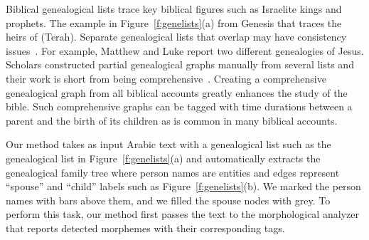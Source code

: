 \documentclass{llncs}
\newcommand{\utfRL}[1]{\setcode{utf8} \RL{#1} \setcode{standard}}
\begin{document}



%
Biblical genealogical lists 
trace key biblical figures such as 
Israelite kings and prophets.
The example in 
Figure~\ref{f:genelists}(a)
from Genesis that traces the
heirs of \utfRL{تارح} (Terah).
Separate genealogical lists that overlap may have consistency 
issues~\cite{completeBibleGenealogy:Online}. 
For example, Matthew and Luke report two different 
genealogies of Jesus. 
Scholars constructed partial genealogical graphs 
manually from several lists
and their work is short from being 
comprehensive~\cite{Belote:Online,SoulLiberty:Online}.
Creating a comprehensive genealogical graph from all biblical 
accounts greatly enhances the study of the bible. 
Such comprehensive graphs can be tagged
with time durations between a parent and the birth of 
its children as is common in many biblical accounts. 

Our method takes as input Arabic text with a genealogical
list such as the genealogical list in
Figure~\ref{f:genelists}(a) 
and automatically extracts the genealogical family tree 
where person names are entities and edges represent 
``spouse'' and ``child'' labels such as 
Figure~\ref{f:genelists}(b).
We marked the person names with bars above them, and we 
filled the spouse nodes with grey. 
To perform this task, our method first passes the text to
the morphological analyzer that reports detected morphemes 
with their corresponding tags. 
\end{document}
